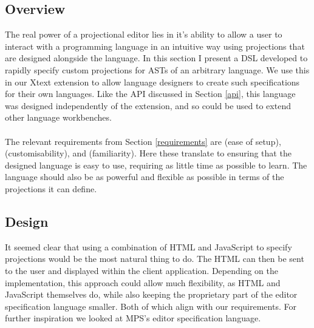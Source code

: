 \documentclass{article}
\begin{document}
{\subsection{Overview}
The real power of a projectional editor lies in it's ability to allow a user to interact with a programming language in an intuitive way using projections that are designed alongside the language. In this section I present a DSL developed to rapidly specify custom projections for ASTs of an arbitrary language. We use this in our Xtext extension to allow language designers to create such specifications for their own languages. Like the API discussed in Section \ref{api}, this language was designed independently of the extension, and so could be used to extend other language workbenches.
\\
\\
The relevant requirements from Section \ref{requirements} are \RSetup (ease of setup), \RCustom (customisability), and \RFamiliarity (familiarity). Here these translate to ensuring that the designed language is easy to use, requiring as little time as possible to learn. The language should also be as powerful and flexible as possible in terms of the projections it can define.

\subsection{Design}

It seemed clear that using a combination of HTML and JavaScript to specify projections would be the most natural thing to do. The HTML can then be sent to the user and displayed within the client application. Depending on the implementation, this approach could allow much flexibility, as HTML and JavaScript themselves do, while also keeping the proprietary part of the editor specification language smaller. Both of which align with our requirements. For further inspiration we looked at MPS's editor specification language.

}
\end{document}
